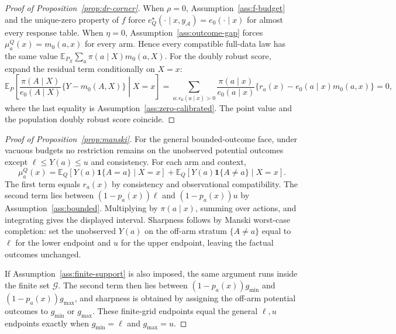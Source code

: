 \documentclass[11pt]{article}
\newcommand{\E}{\mathbb{E}}
\newcommand{\one}{\mathbf{1}}
\theoremstyle{definition}
\theoremstyle{plain}
\theoremstyle{remark}
\begin{document}
\begin{proof}[Proof of Proposition~\ref{prop:dr-corner}]
When $\rho=0$, Assumption~\ref{ass:f-budget} and the unique-zero property of
$f$ force $e_Q^\star(\cdot\mid x,y_{\mathcal A})=e_0(\cdot\mid x)$ for almost
every response table.  When $\eta=0$, Assumption~\ref{ass:outcome-gap} forces
$\mu_a^Q(x)=m_0(a,x)$ for every arm.  Hence every compatible full-data law has
the same value
$\E_{P_X}\sum_a\pi(a\mid X)m_0(a,X)$.  For the doubly robust score, expand the
residual term conditionally on $X=x$:
\[
  \E_P\!\left[
    \frac{\pi(A\mid X)}{e_0(A\mid X)}\{Y-m_0(A,X)\}\middle|X=x
  \right]
  =\sum_{a:e_0(a\mid x)>0} \frac{\pi(a\mid x)}{e_0(a\mid x)}
        \{r_a(x)-e_0(a\mid x)m_0(a,x)\}=0,
\]
where the last equality is Assumption~\ref{ass:zero-calibrated}.  The point
value and the population doubly robust score coincide.
\end{proof}

\begin{proof}[Proof of Proposition~\ref{prop:manski}]
For the general bounded-outcome face, under vacuous budgets no restriction
remains on the unobserved potential outcomes except $\ell\le Y(a)\le u$ and
consistency.  For each arm and context,
\[
  \mu_a^Q(x)
  =\E_Q[Y(a)\one\{A=a\}\mid X=x]
   +\E_Q[Y(a)\one\{A\ne a\}\mid X=x].
\]
The first term equals $r_a(x)$ by consistency and observational compatibility.
The second term lies between $(1-p_a(x))\ell$ and $(1-p_a(x))u$ by
Assumption~\ref{ass:bounded}.  Multiplying by $\pi(a\mid x)$, summing over
actions, and integrating gives the displayed interval.  Sharpness follows by
Manski worst-case completion: set the unobserved $Y(a)$ on the off-arm stratum
$\{A\ne a\}$ equal to $\ell$ for the lower endpoint and $u$ for the upper
endpoint, leaving the factual outcomes unchanged.

If Assumption~\ref{ass:finite-support} is also imposed, the same argument runs
inside the finite set $\mathcal G$.  The second term then lies between
$(1-p_a(x))g_{\min}$ and $(1-p_a(x))g_{\max}$, and sharpness is obtained by
assigning the off-arm potential outcomes to $g_{\min}$ or $g_{\max}$.  These
finite-grid endpoints equal the general $\ell,u$ endpoints exactly when
$g_{\min}=\ell$ and $g_{\max}=u$.
\end{proof}
\end{document}
